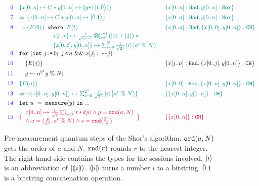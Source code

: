\begin{figure}[t]
{\[\begin{array}{r l l}
\textcolor{blue}{6}
&
\textcolor{teal}{
\{x[0..n] \mapsto C * y[0..n] \mapsto \dabs{y\splus 1}(\ket{\overline{0}}) \}
}
&
\textcolor{teal}{
\{x[0..n]: \thadt, y[0..n]: \tnort\}
}
\\[0.5em]
\textcolor{blue}{7}
&
\textcolor{teal}{
\Rightarrow
\{x[0..n] \mapsto C * y[0..n] \mapsto \ket{\overline{0}.1} \}
}
&
\textcolor{teal}{
\{x[0..n]: \thadt, y[0..n]: \tnort\}
}
\\[0.5em]
\textcolor{blue}{8}
& 
\textcolor{teal}{
\Rightarrow
\{ E(0) \}
}
\;\;
\texttt{where}\;\;
\textcolor{teal}{E(t) =}
&
\textcolor{teal}{
\{x[0..n]: \thadt, \{x[0..0],y[0..n]\}: \tcht\}
}
\\[0.2em]
&
\qquad\qquad\quad\;
\textcolor{teal}{
\begin{array}{l}
x[t..n] \mapsto \shadi{2^{n \,\sminus\,  t}}{n \,\sminus\, t}{}\;*
\\[0.2em]
\{x[0..t],y[0..n]\} \mapsto \schai{2^t}{\frac{1}{\sqrt{2^t}}}{i}{\ket{a^{i}\;\%\;N}}
\end{array}
}
\\[0.5em]
\textcolor{blue}{9}
&\sqforh{\sint{j}{0}}{j\,\slt\, n}{x[j]}{\dplus{j}}
\\[0.5em]
\textcolor{blue}{10}
&
\quad\{E(j) \}
&
\{x[j..n]: \thadt, \{x[0..j],y[0..n]\}: \tcht\}
\\[0.4em]
\textcolor{blue}{11}
&
\quad\ssassign{y}{}{a^{2^j}y\;\%\; N};
\\[0.5em]
\textcolor{blue}{12}
&
\textcolor{teal}{
\{E(n) \}
}
&
\textcolor{teal}{
\{x[0..0]: \thadt, \{x[0..n],y[0..n]\}: \tcht\}
}
\\[0.4em]
\textcolor{blue}{13}
&
\textcolor{teal}{
\Rightarrow
\{\{x[0..n],y[0..n]\} \mapsto \schai{2^{n}}{\frac{1}{\sqrt{2^{n}}}}{i}{\ket{a^{i}\;\%\;N}} \}
}
&
\textcolor{teal}{
\{\{x[0..n],y[0..n]\}: \tcht\}
}
\\[0.4em]
\textcolor{blue}{14}
& \sexp{u}{\smea{y}}{...}
\\[0.4em]
\textcolor{blue}{15}
&
\textcolor{purple}{
\big{\{}
\begin{array}{l}
x[0..n] \mapsto \smch{\frac{1}{\sqrt{s}}}{s}{t\,\splus\,k p} 
\wedge
p = \texttt{ord}(a,N)
\\
\wedge\;
u=(\frac{p}{2^n},a^{t}\;\%\;N)
\wedge
s=\texttt{rnd}(\frac{2^n}{p})
\end{array}
\big{\}}
}
&
\textcolor{purple}{
\{\{x[0..n]\}: \tcht\}
}
\end{array}
\]
}
\caption{Pre-measurement quantum steps of the Shor's algorithm. $\texttt{ord}({a,N})$ gets the order of $a$ and $N$. $\texttt{rnd}({r})$ rounds $r$ to the nearest integer. The right-hand-side contains the types for the sessions involved. $\left\vert{i}\right\rangle$ is an abbreviation of $\left\vert{(\!| i |\!)}\right\rangle$.
$(\!| i |\!)$ turns a number $i$ to a bitstring. $\overline{0}.1$ is a bitstring concatenation operation. }
\label{fig:shorqafny}
\end{figure}


